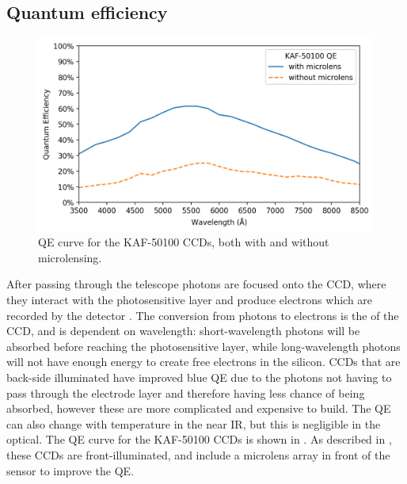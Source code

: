 
\subsection{Quantum efficiency}
\label{sec:qe}
\begin{colsection}

\begin{figure}[t]
    \begin{center}
        \includegraphics[width=\linewidth]{images/throughput/qe.png}
    \end{center}
    \caption[CCD quantum efficiency curve]{
        QE curve for the KAF-50100 CCDs, both with and without microlensing.
    }\label{fig:qe}
\end{figure}

After passing through the telescope photons are focused onto the CCD, where they interact with the photosensitive layer and produce electrons which are recorded by the detector \citep{CCDs}. The conversion from photons to electrons is the  of the CCD, and is dependent on wavelength: short-wavelength photons will be absorbed before reaching the photosensitive layer, while long-wavelength photons will not have enough energy to create free electrons in the silicon. CCDs that are back-side illuminated have improved blue QE due to the photons not having to pass through the electrode layer and therefore having less chance of being absorbed, however these are more complicated and expensive to build. The QE can also change with temperature in the near IR, but this is negligible in the optical. The QE curve for the KAF-50100 CCDs is shown in . As described in , these CCDs are front-illuminated, and include a microlens array in front of the sensor to improve the QE.\@

\end{colsection}

